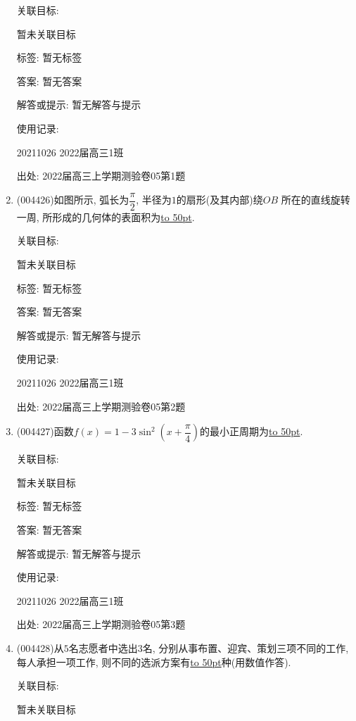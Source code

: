 \documentclass[10pt,a4paper]{article}
\newcommand{\blank}[1]{\underline{\hbox to #1pt{}}}
\begin{document}
\begin{enumerate}[1.]
关联目标:

暂未关联目标



标签: 暂无标签

答案: 暂无答案

解答或提示: 暂无解答与提示

使用记录:

20211026	2022届高三1班	


出处: 2022届高三上学期测验卷05第1题
\item { (004426)}如图所示, 弧长为$\dfrac{\pi}2$, 半径为$1$的扇形(及其内部)绕$OB$
所在的直线旋转一周, 所形成的几何体的表面积为\blank{50}.
\begin{center}
\end{center}


关联目标:

暂未关联目标



标签: 暂无标签

答案: 暂无答案

解答或提示: 暂无解答与提示

使用记录:

20211026	2022届高三1班	


出处: 2022届高三上学期测验卷05第2题
\item { (004427)}函数$f(x)=1-3\sin ^2(x+\dfrac{\pi}4)$的最小正周期为\blank{50}.


关联目标:

暂未关联目标



标签: 暂无标签

答案: 暂无答案

解答或提示: 暂无解答与提示

使用记录:

20211026	2022届高三1班	


出处: 2022届高三上学期测验卷05第3题
\item { (004428)}从$5$名志愿者中选出$3$名, 分别从事布置、迎宾、策划三项不同的工作, 每人承担一项工作, 则不同的选派方案有\blank{50}种(用数值作答).


关联目标:

暂未关联目标




\end{enumerate}
\end{document}
